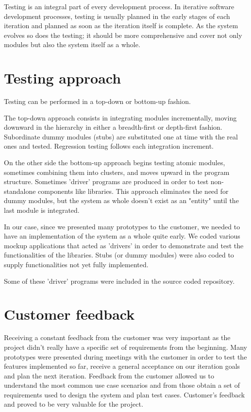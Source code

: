 
Testing is an integral part of every development process.
In iterative software development processes, testing is usually planned in the
early stages of each iteration and planned as soon as the iteration itself is
complete. As the system evolves so does the testing; it should be more
comprehensive and cover not only modules but also the system itself as a whole.

\section{Testing approach}
Testing can be performed in a top-down or bottom-up fashion.

The top-down approach consists in integrating modules incrementally, moving
downward in the hierarchy in either a breadth-first or depth-first fashion. \newline
Subordinate dummy modules (stubs) are substituted one at time with the real ones
and tested. Regression testing follows each integration increment.

On the other side the bottom-up approach begins testing atomic modules,
sometimes combining them into clusters, and moves upward in the program
structure. Sometimes 'driver' programs are produced in order to test \newline
non-standalone components like libraries. This approach eliminates the need for
dummy modules, but the system as whole doesn't exist as an "entity" until the
last module is integrated.

In our case, since we presented many prototypes to the customer, we needed to
have an implementation of the system as a whole quite early. We coded various
mockup applications that acted as 'drivers' in order to demonstrate and test the
functionalities of the libraries. Stubs (or dummy modules) were also coded
to supply functionalities not yet fully implemented.

Some of these 'driver' programs were included in the source coded repository.


\section{Customer feedback}
Receiving a constant feedback from the customer was very important as the
project didn't really have a specific set of requirements from the beginning.
Many prototypes were presented during meetings with the customer in order to
test the features implemented so far, receive a general acceptance on our
iteration goals and plan the next iteration. Feedback from the customer
allowed us to understand the most common use case scenarios and from those
obtain a set of requirements used to design the system and plan test cases.
Customer's feedback and proved to be very valuable for the project.

